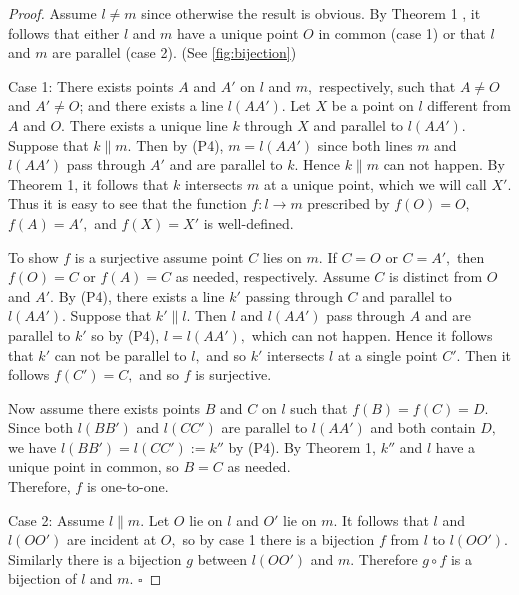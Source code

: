 \documentclass[
  twoside,
  12pt,
  letterpaper,
  fleqn]{article}
\theoremstyle{definition}
\theoremstyle{definition}
\theoremstyle{plain}
\theoremstyle{plain}
\theoremstyle{remark}
\begin{document}
\begin{proof}

Assume \(l\neq m\) since otherwise the result is obvious. By Theorem 1 ,
it follows that either \(l\) and \(m\) have a unique point \(O\) in
common (case 1) or that \(l\) and \(m\) are parallel (case 2). (See
\eqref{fig:bijection})

Case 1: There exists points \(A\) and \(A'\) on \(l\) and \(m,\)
respectively, such that \(A\neq O\) and \(A'\neq O\); and there exists a
line \(l(AA').\) Let \(X\) be a point on \(l\) different from \(A\) and
\(O.\) There exists a unique line \(k\) through \(X\) and parallel to
\(l(AA').\) Suppose that \(k \parallel m.\) Then by (P4), \(m=l(AA')\)
since both lines \(m\) and \(l(AA')\) pass through \(A'\) and are
parallel to \(k.\) Hence \(k \parallel m\) can not happen. By Theorem 1,
it follows that \(k\) intersects \(m\) at a unique point, which we will
call \(X'.\) Thus it is easy to see that the function \(f:l\to m\)
prescribed by \(f(O)=O,\) \(f(A)=A',\) and \(f(X)=X'\) is well-defined.

To show \(f\) is a surjective assume point \(C\) lies on \(m.\) If
\(C=O\) or \(C=A',\) then \(f(O)=C\) or \(f(A)=C\) as needed,
respectively. Assume \(C\) is distinct from \(O\) and \(A'.\) By (P4),
there exists a line \(k'\) passing through \(C\) and parallel to
\(l(AA').\) Suppose that \(k' \parallel l.\) Then \(l\) and \(l(AA')\)
pass through \(A\) and are parallel to \(k'\) so by (P4), \(l=l(AA'),\)
which can not happen. Hence it follows that \(k'\) can not be parallel
to \(l,\) and so \(k'\) intersects \(l\) at a single point \(C'.\) Then
it follows \(f(C')=C,\) and so \(f\) is surjective.

Now assume there exists points \(B\) and \(C\) on \(l\) such that
\(f(B)=f(C)=D.\) Since both \(l(BB')\) and \(l(CC')\) are parallel to
\(l(AA')\) and both contain \(D,\) we have \(l(BB')=l(CC'):=k''\) by
(P4). By Theorem 1, \(k''\) and \(l\) have a unique point in common, so
\(B=C\) as needed.\\
Therefore, \(f\) is one-to-one.

Case 2: Assume \(l \parallel m.\) Let \(O\) lie on \(l\) and \(O'\) lie
on \(m.\) It follows that \(l\) and \(l(OO')\) are incident at \(O,\) so
by case 1 there is a bijection \(f\) from \(l\) to \(l(OO').\) Similarly
there is a bijection \(g\) between \(l(OO')\) and \(m.\) Therefore
\(g\circ f\) is a bijection of \(l\) and \(m.\) \(\square\)

\end{proof}
\end{document}

